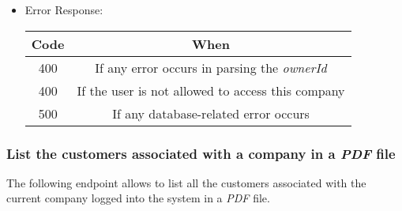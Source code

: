 \begin{itemize}
    \item Error Response:
    \begin{table}[!h]
    \centering
    \begin{tabular}{|c|c|}
    \hline
    \multicolumn{1}{|c|}{\textbf{Code}} & \multicolumn{1}{c|}{\textbf{When}} \\ \hline
    400 & If any error occurs in parsing the \textit{ownerId}  \\\hline
    400 & If the user is not allowed to access this company \\\hline
    500 & If any database-related error occurs \\\hline
    \end{tabular}
    \end{table}

\end{itemize}


\newpage
\subsubsection*{List the customers associated with a company in a \textit{PDF} file}

The following endpoint allows to list all the customers associated with the current company logged into the system in a \textit{PDF} file.

